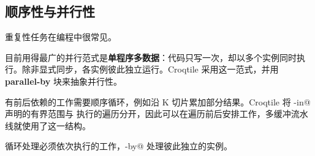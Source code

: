 \subsection*{顺序性与并行性}

重复性任务在编程中很常见。

目前用得最广的并行范式是\textbf{单程序多数据}：代码只写一次，却以多个实例同时执行。除非显式同步，各实例彼此独立运行。Croqtile 采用这一范式，并用 \textbf{parallel-by} 块来抽象并行性。

有前后依赖的工作需要顺序循环，例如沿 K 切片累加部分结果。Croqtile 将 \co@with-in@ 声明的有界范围与 \co@foreach@ 执行的遍历分开，因此可以在遍历前后安排工作，多缓冲流水线就使用了这一结构。

循环处理必须依次执行的工作，\co@parallel-by@ 处理彼此独立的实例。
